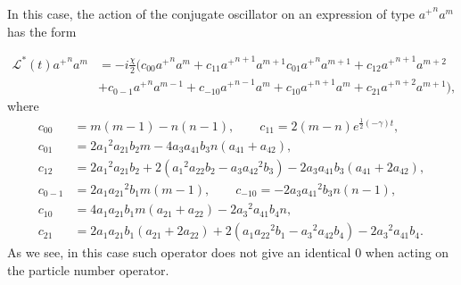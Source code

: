 \documentclass[12pt]{article}
\theoremstyle{definition}
\begin{document}
	In this case, the action of the conjugate oscillator on an expression of type ${a^+}^na^m$ has the form
	
	\begin{align}
		\label{eq:ActOfGenOnExpr}
		\mathcal{L}^*(t){a^+}^na^m &= -i\frac{\chi}{2}(c_{00}{a^+}^na^m + c_{11}{a^+}^{n+1}a^{m+1} c_{01}{a^+}^na^{m + 1} + c_{12}{a^+}^{n + 1}a^{m + 2} \nonumber\\&+ c_{0-1}{a^+}^na^{m-1} + c_{-10}{a^+}^{n - 1}a^m + c_{10}{a^+}^{n+1}a^m + c_{21}{a^+}^{n+2}a^{m+1}),
	\end{align}
	where
	\begin{align*}
		c_{00} &= m (m-1)-n (n-1), \qquad
		c_{11} = 2 (m-n) e^{\frac{1}{2} (-\gamma ) t}, \\
		c_{01} &= 2 {a_1}^2 {a_{21}} {b_2} m-4 {a_3} {a_{41}} {b_3} n ({a_{41}}+{a_{42}}),\\
		c_{12} &= 2 {a_1}^2 {a_{21}} {b_2}+2 \left({a_1}^2 {a_{22}} {b_2}-{a_3} {a_{42}}^2 {b_3}\right)-2 {a_3} {a_{41}} {b_3} ({a_{41}}+2 {a_{42}}),\\
		c_{0-1} &= 2 {a_1} {a_{21}}^2 {b_1} m (m-1),\qquad
		c_{-10} =-2 {a_3} {a_{41}}^2 {b_3} n (n-1),\\
		c_{10} &= 4 {a_1} {a_{21}} {b_1} m ({a_{21}}+{a_{22}})-2 {a_3}^2 {a_{41}} {b_4} n,\\
		c_{21} &= 2 {a_1} {a_{21}} {b_1} ({a_{21}}+2 {a_{22}})+2 \left({a_1} {a_{22}}^2 {b_1}-{a_3}^2 {a_{42}} {b_4}\right)-2 {a_3}^2 {a_41} {b_4}.
	\end{align*}
	As we see, in this case such operator does not give an identical 0 when acting on the particle number operator.
	
	
	
\end{document}
